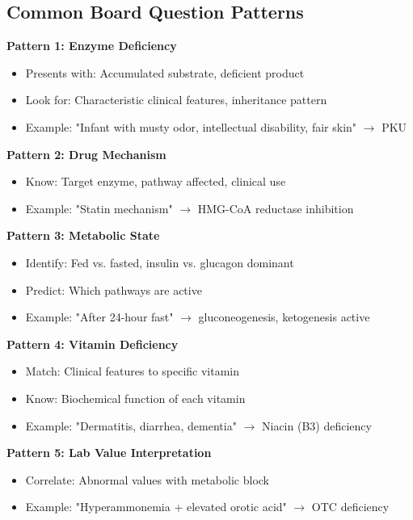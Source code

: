 \subsection{Common Board Question Patterns}

\begin{tcolorbox}[colback=gray!10, colframe=gray!70!black, title=\textbf{Recognizing Question Patterns}]

\textbf{Pattern 1: Enzyme Deficiency}
\begin{itemize}
    \item Presents with: Accumulated substrate, deficient product
    \item Look for: Characteristic clinical features, inheritance pattern
    \item Example: "Infant with musty odor, intellectual disability, fair skin" $\rightarrow$ PKU
\end{itemize}

\textbf{Pattern 2: Drug Mechanism}
\begin{itemize}
    \item Know: Target enzyme, pathway affected, clinical use
    \item Example: "Statin mechanism" $\rightarrow$ HMG-CoA reductase inhibition
\end{itemize}

\textbf{Pattern 3: Metabolic State}
\begin{itemize}
    \item Identify: Fed vs. fasted, insulin vs. glucagon dominant
    \item Predict: Which pathways are active
    \item Example: "After 24-hour fast" $\rightarrow$ gluconeogenesis, ketogenesis active
\end{itemize}

\textbf{Pattern 4: Vitamin Deficiency}
\begin{itemize}
    \item Match: Clinical features to specific vitamin
    \item Know: Biochemical function of each vitamin
    \item Example: "Dermatitis, diarrhea, dementia" $\rightarrow$ Niacin (B3) deficiency
\end{itemize}

\textbf{Pattern 5: Lab Value Interpretation}
\begin{itemize}
    \item Correlate: Abnormal values with metabolic block
    \item Example: "Hyperammonemia + elevated orotic acid" $\rightarrow$ OTC deficiency
\end{itemize}
\end{tcolorbox}

